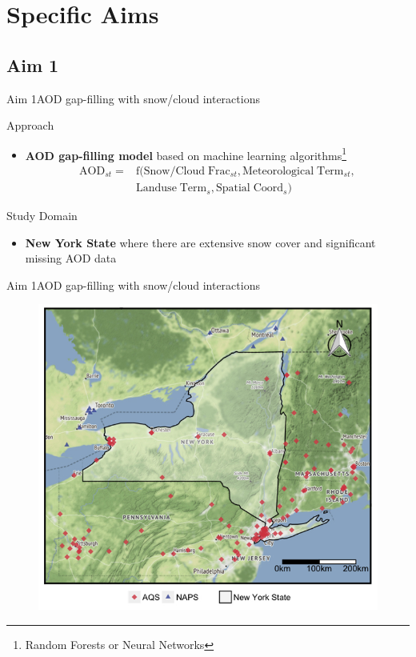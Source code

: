 \documentclass[handout]{beamer} %
\begin{document}
\section{Specific Aims}
\subsection{Aim 1}
\begin{frame}{Aim 1}{AOD gap-filling with snow/cloud interactions}
    \begin{block}{Approach}
        \begin{itemize}
            \item \textbf{AOD gap-filling model} based on machine learning algorithms\footnote{Random Forests or Neural Networks}
                \begin{align*}
                    \mathrm{AOD_{\mathit{st}}} = & \mathrm{f(Snow/Cloud\;Frac_{\mathit{st}}, Meteorological\;Term_{\mathit{st}},}\\
                    &\mathrm{Landuse\;Term_\mathit{s}, Spatial\;Coord_\mathit{s})}
                \end{align*}
        \end{itemize}
    \end{block}
    \vspace{-15pt}
    \pause
    \begin{block}{Study Domain}
        \begin{itemize}
            \item \textbf{New York State} where there are extensive snow cover and significant missing AOD data
        \end{itemize}
    \end{block}
\end{frame}

\begin{frame}{Aim 1}{AOD gap-filling with snow/cloud interactions}
    \begin{figure}
        \centering
        \includegraphics[height=0.6\textwidth]{img/ny.jpg}
        \label{fig:aim1}
    \end{figure}
\end{frame}
\end{document}

